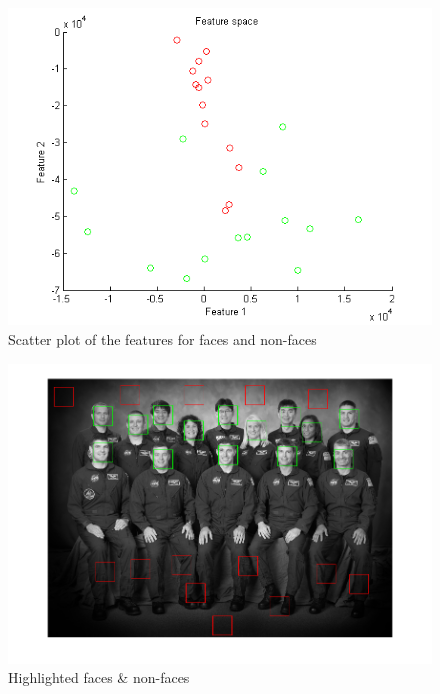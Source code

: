 \begin{figure}[h!tb]
	\centering
		\includegraphics[width=\textwidth]{./img/ex1/featscatter.png}
	\caption{Scatter plot of the features for faces and non-faces}
	\label{fig:featscatter}
\end{figure}

\begin{figure}[h!tb]
	\centering
		\includegraphics[width=\textwidth]{./img/ex1/facesandnonfaceshighlighted.png}
	\caption{Highlighted faces \& non-faces}
	\label{fig:facesandnonfaceshighlighted}
\end{figure}

